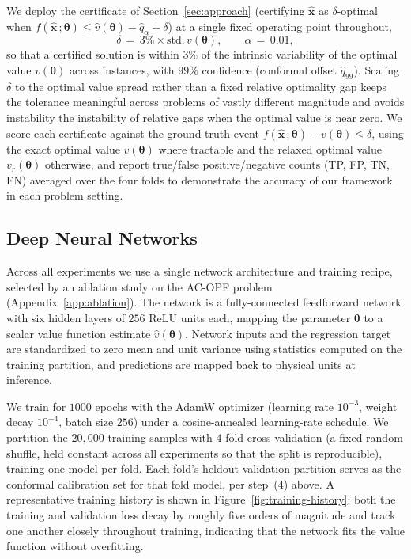 \documentclass[10pt]{article} %
\theoremstyle{plain}
\theoremstyle{definition}
\theoremstyle{remark}
\begin{document}
We deploy the certificate of Section~\ref{sec:approach} (certifying $\hat{\mathbf{x}}$ as $\delta$-optimal when $f(\hat{\mathbf{x}}\,;\bm{\theta}) \leq \hat{v}(\bm{\theta}) - \hat{q}_\alpha + \delta$) at a single fixed operating point throughout,
\begin{equation*}
    \delta \,=\, 3 \% \times \mathrm{std.\,}v(\bm{\theta}), \qquad \alpha \,=\, 0.01,
\end{equation*}
so that a certified solution is within $3\%$ of the intrinsic variability of the optimal value $v(\bm{\theta})$ across instances, with $99\%$ confidence (conformal offset $\hat{q}_{99}$). Scaling $\delta$ to the optimal value spread rather than a fixed relative optimality gap keeps the tolerance meaningful across problems of vastly different magnitude and avoids instability the instability of relative gaps when the optimal value is near zero. We score each certificate against the ground-truth event $f(\hat{\mathbf{x}}\,;\bm{\theta}) - v(\bm{\theta}) \leq \delta$, using the exact optimal value $v(\bm{\theta})$ where tractable and the relaxed optimal value $v_r(\bm{\theta})$ otherwise, and report true/false positive/negative counts (TP, FP, TN, FN) averaged over the four folds to demonstrate the accuracy of our framework in each problem setting.

\subsection*{Deep Neural Networks} \label{subsec:dnn}

Across all experiments we use a single network architecture and training recipe, selected by an ablation study on the AC-OPF problem (Appendix~\ref{app:ablation}). The network is a fully-connected feedforward network with six hidden layers of $256$ ReLU units each, mapping the parameter $\bm{\theta}$ to a scalar value function estimate $\hat{v}(\bm{\theta})$. Network inputs and the regression target are standardized to zero mean and unit variance using statistics computed on the training partition, and predictions are mapped back to physical units at inference.

We train for $1000$ epochs with the AdamW optimizer (learning rate $10^{-3}$, weight decay $10^{-4}$, batch size $256$) under a cosine-annealed learning-rate schedule. We partition the $20{,}000$ training samples with $4$-fold cross-validation (a fixed random shuffle, held constant across all experiments so that the split is reproducible), training one model per fold. Each fold's heldout validation partition serves as the conformal calibration set for that fold model, per step~(4) above. A representative training history is shown in Figure~\ref{fig:training-history}: both the training and validation loss decay by roughly five orders of magnitude and track one another closely throughout training, indicating that the network fits the value function without overfitting.
\end{document}
